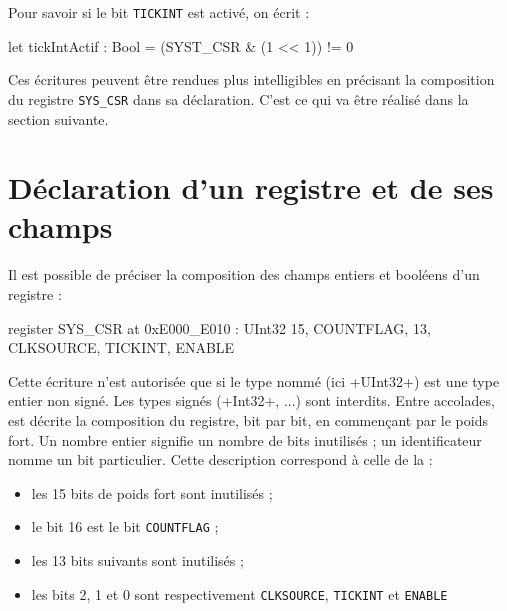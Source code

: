 Pour savoir si le bit \texttt{TICKINT} est activé, on écrit :
\begin{PLM}
let tickIntActif : Bool = (SYST_CSR & (1 << 1)) != 0
\end{PLM}

Ces écritures peuvent être rendues plus intelligibles en précisant la composition du registre \texttt{SYS\_CSR} dans sa déclaration. C'est ce qui va être réalisé dans la section suivante.


\section{Déclaration d'un registre et de ses champs}



Il est possible de préciser la composition des champs entiers et booléens d'un registre :
\begin{PLM}
register SYS_CSR at 0xE000_E010
  : UInt32 {15, COUNTFLAG, 13, CLKSOURCE, TICKINT, ENABLE}
\end{PLM}

Cette écriture n'est autorisée que si le type nommé (ici \plm+UInt32+) est une type entier non signé. Les types signés (\plm+Int32+, ...) sont interdits. Entre accolades, est décrite la composition du registre, bit par bit, en commençant par le poids fort. Un nombre entier signifie un nombre de bits inutilisés ; un identificateur nomme un bit particulier. Cette description correspond à celle de la  :
\begin{itemize}
\item les 15 bits de poids fort sont inutilisés ;
\item le bit 16 est le bit \texttt{COUNTFLAG} ;
\item les 13 bits suivants sont inutilisés ;
\item les bits 2, 1 et 0 sont respectivement \texttt{CLKSOURCE}, \texttt{TICKINT} et \texttt{ENABLE}
\end{itemize}

